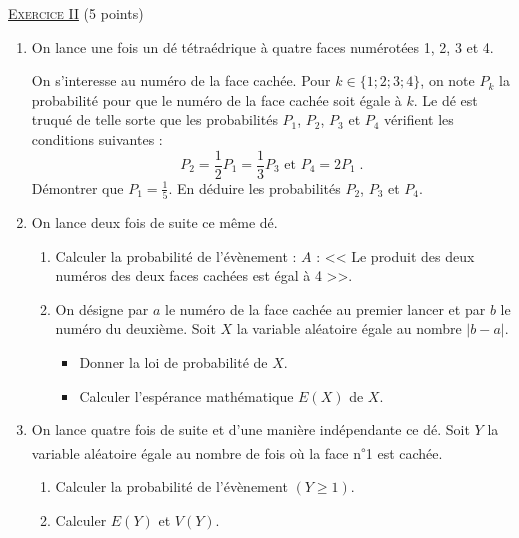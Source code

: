 \noindent \underline{\textsc{Exercice II}} (5 points) 
      \begin{enumerate}
            \item On lance une fois un d\'e t\'etra\'edrique \`a quatre faces num\'erot\'ees 1, 2, 3 et 4.
                  
                  On s'interesse au num\'ero de la face cach\'ee.
                  Pour $k \in \{ 1; 2 ; 3 ; 4 \}$, on note $P_k$ la probabilit\'e pour que 
                  le num\'ero de la face cach\'ee soit \'egale \`a $k$. \newline
                  Le d\'e est truqu\'e de telle sorte que les probabilit\'es $P_1$, $P_2$, $P_3$ et $P_4$ 
                  v\'erifient les conditions suivantes : 
                  \[
                        P_2 = \frac{1}{2} P_1 = \frac{1}{3} P_3 \text{ et } P_4 = 2 P_1 \;.
                  \]
                  D\'emontrer que $P_1 = \frac{1}{5}$.
                  En d\'eduire les probabilit\'es $P_2$, $P_3$ et $P_4$.
            \item On lance deux fois de suite ce m\^eme d\'e.
                  \begin{enumerate}
                        \item Calculer la probabilit\'e de l'\'ev\`enement : \newline
                              $A$ : << Le produit des deux num\'eros des deux faces cach\'ees est \'egal \`a 4 >>.
                        \item On d\'esigne par $a$ le num\'ero de la face cach\'ee au premier lancer et par $b$ 
                              le num\'ero du deuxi\`eme.
                              Soit $X$ la variable al\'eatoire \'egale au nombre $| b - a|$.
                              \begin{itemize}
                                    \item Donner la loi de probabilit\'e de $X$.
                                    \item Calculer l'esp\'erance math\'ematique $E(X)$ de $X$.
                              \end{itemize}
                  \end{enumerate}
            \item On lance quatre fois de suite et d'une mani\`ere ind\'ependante ce d\'e.
                  Soit $Y$ la variable al\'eatoire \'egale au nombre de fois o\`u la 
                  face n\textsuperscript{$\circ$}1 est cach\'ee.
                  \begin{enumerate}
                        \item Calculer la probabilit\'e de l'\'ev\`enement $(Y \geq 1)$.
                        \item Calculer $E(Y)$ et $V(Y)$.
                  \end{enumerate}
      \end{enumerate}
